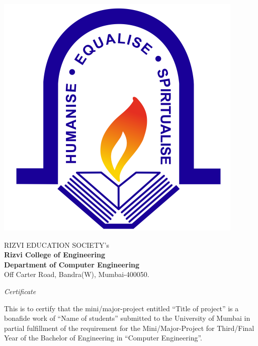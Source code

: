 \cleardoublepage
\thispagestyle{empty}
\vspace*{\fill}
\begin{center}
	\begin{minipage}{0.25\textwidth}
		\begin{flushright}
			\includegraphics[width=0.7\linewidth]{images/rcoe-logo.png}
		\end{flushright}
	\end{minipage}
	\hfill
	\begin{minipage}{0.70\textwidth}
		\raggedright
		\normalsize  RIZVI EDUCATION SOCIETY's\\
		\LARGE \textbf{Rizvi College of Engineering}\\
		\large \textbf{Department of Computer Engineering}\\
		\normalsize Off Carter Road, Bandra(W), Mumbai-400050.
	\end{minipage}
	
	
\end{center}
\vspace{0.5cm}
\begin{center}
	{\LARGE \textit{Certificate}}\\[1cm]
\end{center}


This is to certify that the mini/major-project entitled “Title of project” is a bonafide work of “Name of students” submitted to the University of Mumbai in partial fulfillment of the requirement for the Mini/Major-Project for Third/Final Year of the Bachelor of Engineering in “Computer Engineering”.

